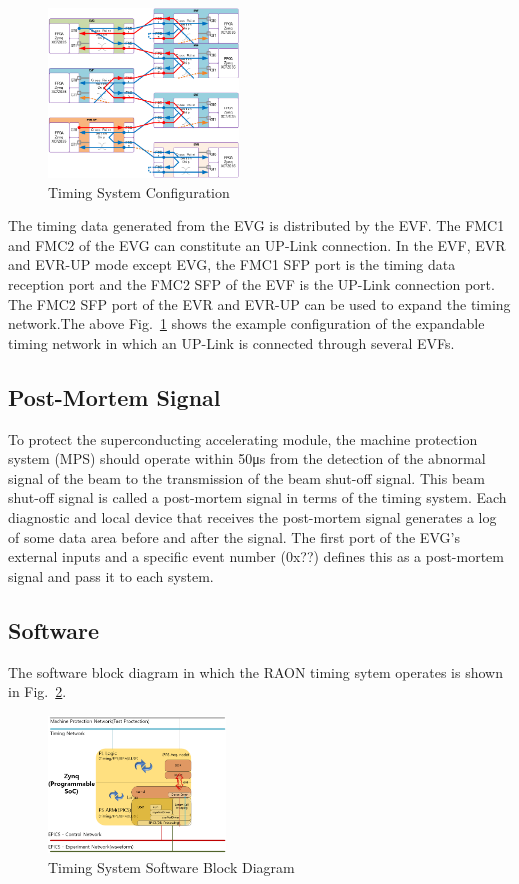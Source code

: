 \documentclass[journal,reqno]{IEEEtran}
\begin{document}
\begin{figure}[!htb]
	\centering
	\includegraphics*[width=0.45\textwidth, height=0.4\textwidth]{img14.png}
	\caption{Timing System Configuration}
	\label{timing_conf}
\end{figure}
The timing data generated from the EVG is distributed by the EVF. The FMC1 and FMC2 of the EVG can constitute an UP-Link connection. In the EVF, EVR and EVR-UP mode except EVG, the FMC1 SFP port is the timing data reception port and the FMC2 SFP of the EVF is the UP-Link connection port. The FMC2 SFP port of the EVR and EVR-UP can be used to expand the timing network.The above Fig.~\ref{timing_conf} shows the example configuration of the expandable timing network in which an UP-Link is connected through several EVFs.

\subsection{Post-Mortem Signal}
To protect the superconducting accelerating module, the machine protection system (MPS) should operate within 50μs from the detection of the abnormal signal of the beam to the transmission of the beam shut-off signal. This beam shut-off signal is called a post-mortem signal in terms of the timing system. Each diagnostic and local device that receives the post-mortem signal generates a log of some data area before and after the signal. The first port of the EVG's external inputs and a specific event number (0x??) defines this as a post-mortem signal and pass it to each system.

\subsection{Software}
The software block diagram in which the RAON timing sytem operates is shown in Fig.~\ref{timing_sw_block}.


\begin{figure}[!htb]
	\centering
	\includegraphics*[width=0.42\textwidth, height=0.35\textwidth]{img24.png}
	\caption{Timing System Software Block Diagram}
	\label{timing_sw_block}
\end{figure}
\end{document}

